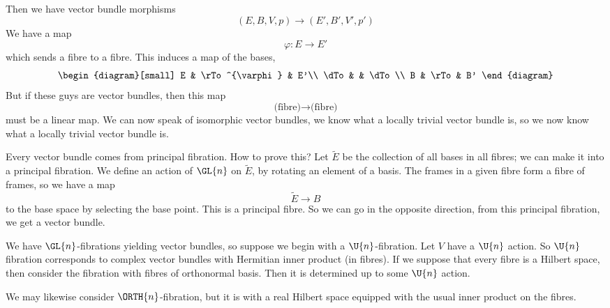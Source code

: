 Then we have vector bundle morphisms
\begin{equation}
(E,B,V,p)\to(E',B',V',p')
\end{equation}
We have a map
\begin{equation}
\varphi\colon E\to E'
\end{equation}
which sends a fibre to a fibre. This induces a map of the bases,
\begin{equation}
\begin{diagram}[small]
E    & \rTo^{\varphi} & E'\\
\dTo &               & \dTo \\
B    & \rTo          & B'
\end{diagram}
\end{equation}
But if these guys are vector bundles, then this map 
\begin{equation}
\mbox{(fibre)}\to\mbox{(fibre)}
\end{equation}
must be a linear map. We can now speak of isomorphic vector
bundles, we know what a locally trivial vector bundle is, so we
now know what a locally trivial vector bundle is.

Every vector bundle comes from principal fibration. How to prove
this? Let $\widetilde{E}$ be the collection of all bases in all
fibres; we can make it into a principal fibration. We define an
action of $\GL{n}$ on $\widetilde{E}$, by rotating an element of
a basis. The frames in a given fibre form a fibre of frames, so
we have a map
\begin{equation}
\widetilde{E}\to B
\end{equation}
to the base space by selecting the base point. This is a
principal fibre. So we can go in the opposite direction, from
this principal fibration, we get a vector bundle.

We have $\GL{n}$-fibrations yielding vector bundles, so suppose
we begin with a $\U{n}$-fibration. Let $V$ have a $\U{n}$
action. So $\U{n}$ fibration corresponds to complex vector
bundles with Hermitian inner product (in fibres). If we suppose
that every fibre is a Hilbert space, then consider the fibration
with fibres of orthonormal basis. Then it is determined up to
some $\U{n}$ action.

We may likewise consider $\ORTH{n}$-fibration, but it is with a
real Hilbert space equipped with the usual inner product on the
fibres. 

